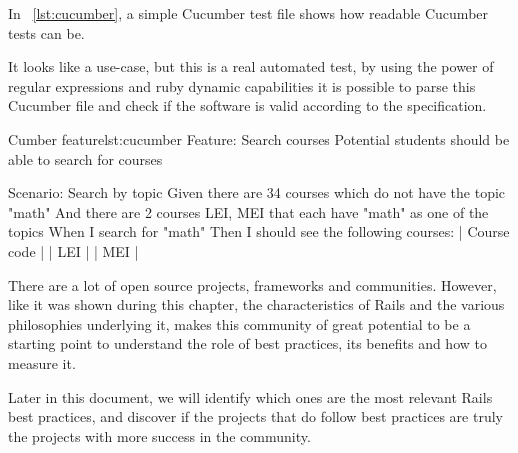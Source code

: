In ~\ref{lst:cucumber}, a simple Cucumber test file shows how readable Cucumber tests can be.

It looks like a use-case, but this is a real automated test, 
by using the power of regular expressions and ruby dynamic capabilities
it is possible to parse this Cucumber file and check if the software is valid according to the specification. 

\begin{rubycode}{Cumber feature}{lst:cucumber}
Feature: Search courses
  Potential students should be able to search for courses

  Scenario: Search by topic
    Given there are 34 courses which do not have the topic "math"
    And there are 2 courses LEI, MEI that each have "math" as one of the topics
    When I search for "math"
    Then I should see the following courses:
      | Course code |
      | LEI         |
      | MEI         |
\end{rubycode}

There are a lot of open source projects, frameworks and communities. 
However, like it was shown during this chapter, the characteristics of Rails and the various philosophies underlying it,
makes this community of great potential to be a starting point to understand the role of best practices, 
its benefits and how to measure it. 

Later in this document, we will identify which ones are the most relevant Rails best practices,
and discover if the projects that do follow best practices are truly the projects with more success in the community.


